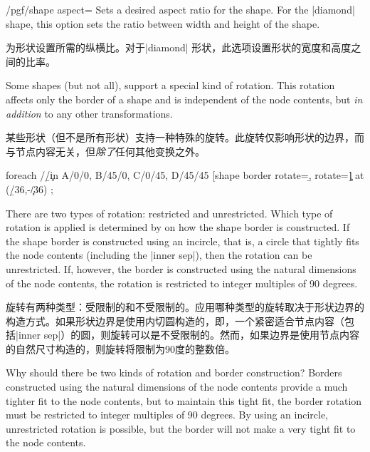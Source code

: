 \begin{key}{/pgf/shape aspect=}
    Sets a desired aspect ratio for the shape. For the |diamond| shape, this
    option sets the ratio between width and height of the shape.
    
    为形状设置所需的纵横比。对于|diamond| 形状，此选项设置形状的宽度和高度之间的比率。
\begin{codeexample}[preamble={\usetikzlibrary{shapes.geometric}}]
\end{codeexample}
\end{key}

    \label{section-rotating-shape-borders}

Some shapes (but not all), support a special kind of rotation. This rotation
affects only the border of a shape and is independent of the node contents, but
\emph{in addition} to any other transformations.

某些形状（但不是所有形状）支持一种特殊的旋转。此旋转仅影响形状的边界，而与节点内容无关，但\emph{除了}任何其他变换之外。
\begin{codeexample}[preamble={\usetikzlibrary{shapes.geometric}}]
\tikz \node foreach \a/\b/\c in {A/0/0, B/45/0, C/0/45, D/45/45}
            [shape border rotate=\b, rotate=\c] at (\b/36,-\c/36) {\a};
\end{codeexample}

There are two types of rotation: restricted and unrestricted. Which type of
rotation is applied is determined by on how the shape border is constructed. If
the shape border is constructed using an incircle, that is, a circle that
tightly fits the node contents (including the |inner sep|), then the rotation
can be unrestricted. If, however, the border is constructed using the natural
dimensions of the node contents, the rotation is restricted to integer
multiples of 90 degrees.

旋转有两种类型：受限制的和不受限制的。应用哪种类型的旋转取决于形状边界的构造方式。如果形状边界是使用内切圆构造的，即，一个紧密适合节点内容（包括|inner sep|）的圆，则旋转可以是不受限制的。然而，如果边界是使用节点内容的自然尺寸构造的，则旋转将限制为90度的整数倍。

Why should there be two kinds of rotation and border construction? Borders
constructed using the natural dimensions of the node contents provide a much
tighter fit to the node contents, but to maintain this tight fit, the border
rotation must be restricted to integer multiples of 90 degrees. By using an
incircle, unrestricted rotation is possible, but the border will not make a
very tight fit to the node contents.

